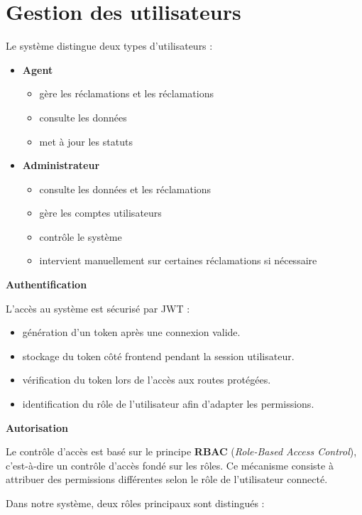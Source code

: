 \documentclass[12pt,a4paper,oneside]{report}
\begin{document}
\section{Gestion des utilisateurs}
Le système distingue deux types d’utilisateurs :
\begin{itemize}
\item\textbf{Agent}

    \begin{itemize}
        \item gère les réclamations et les réclamations
        \item consulte les données 
        \item met à jour les statuts
    \end{itemize}
\item \textbf{Administrateur}
    \begin{itemize}
        \item consulte les données et les réclamations
        \item gère les comptes utilisateurs
        \item contrôle le système
        \item intervient manuellement sur certaines réclamations si nécessaire
    \end{itemize}

\end{itemize}

\textbf{Authentification}

L’accès au système est sécurisé par JWT \cite{jwtio} :

\begin{itemize}
    \item génération d’un token après une connexion valide.
    \item stockage du token côté frontend pendant la session utilisateur.
    \item vérification du token lors de l’accès aux routes protégées.
    \item identification du rôle de l’utilisateur afin d’adapter les permissions.
\end{itemize}

\textbf{Autorisation}

Le contrôle d’accès est basé sur le principe \textbf{RBAC} (\textit{Role-Based Access Control}), c’est-à-dire un contrôle d’accès fondé sur les rôles. Ce mécanisme consiste à attribuer des permissions différentes selon le rôle de l’utilisateur connecté.

Dans notre système, deux rôles principaux sont distingués :
\end{document}
